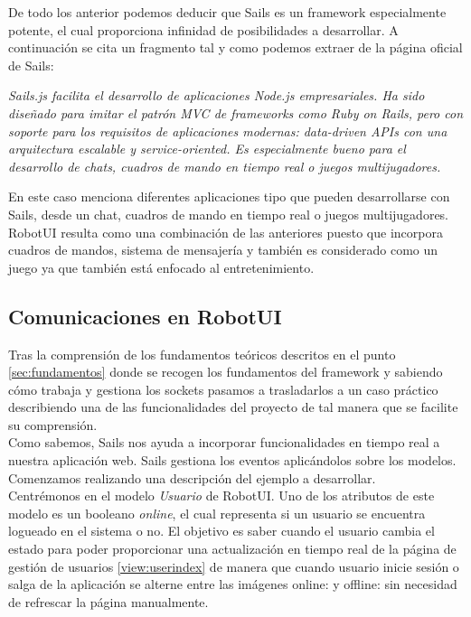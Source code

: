De todo los anterior podemos deducir que Sails es un framework especialmente potente, el cual proporciona infinidad de posibilidades a desarrollar. A continuación se cita un fragmento tal y 
como podemos extraer de la página oficial de Sails:\\

\begin{center}
\emph{Sails.js facilita el desarrollo de aplicaciones Node.js empresariales. Ha sido diseñado para imitar el patrón MVC de frameworks como Ruby on Rails, pero con soporte para los requisitos de aplicaciones modernas: data-driven APIs con una arquitectura escalable y service-oriented. Es especialmente bueno para el desarrollo de chats, cuadros de mando en tiempo real o juegos multijugadores.} 
\end{center}


En este caso menciona diferentes aplicaciones tipo que pueden desarrollarse con Sails, desde un chat, cuadros de mando en tiempo real o juegos multijugadores. RobotUI resulta como una combinación de las 
anteriores puesto que incorpora cuadros de mandos, sistema de mensajería y también es considerado como un juego ya que también está enfocado al entretenimiento.\\





\subsection{ Comunicaciones en RobotUI }
\label{sec:comunicaciones-robotui}



Tras la comprensión de los fundamentos teóricos descritos en el punto \ref{sec:fundamentos} donde se recogen los fundamentos del framework y sabiendo cómo trabaja y gestiona los sockets pasamos
a trasladarlos a un caso práctico describiendo una de las funcionalidades del proyecto de tal manera que se facilite su comprensión.\\

Como sabemos, Sails nos ayuda a incorporar funcionalidades en tiempo real a nuestra aplicación web. Sails gestiona los eventos aplicándolos sobre los modelos. Comenzamos realizando una descripción
del ejemplo a desarrollar.\\

Centrémonos en el modelo \emph{Usuario} de RobotUI. Uno de los atributos de este modelo es un booleano \emph{online}, el cual representa si un usuario se encuentra logueado en el sistema o no. El objetivo 
es saber cuando el usuario cambia el estado para poder proporcionar una actualización en tiempo real de la página de gestión de usuarios \ref{view:userindex} de manera que cuando usuario inicie sesión o salga de la 
aplicación se alterne entre las imágenes online:  y offline:  sin necesidad de refrescar la página manualmente.\\

